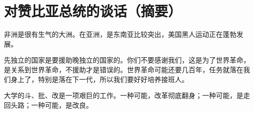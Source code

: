 \section[对赞比亚总统的谈话（摘要）（一九六七年六月）]{对赞比亚总统的谈话（摘要）}


非洲是很有生气的大洲。在亚洲，是东南亚比较突出，美国黑人运动正在蓬勃发展。

先独立的国家是要援助晚独立的国家的。你们不要感谢我们，这是为了世界革命，是关系到世界革命，不援助才是错误的。世界革命可能还要几百年，任务就落在我们身上了，特别是落在下一代，所以我们要好好培养接班人。


大学的斗、批、改是一项艰巨的工作。一种可能，改革彻底翻身；一种可能，是走回头路；一种可能，是改良。

